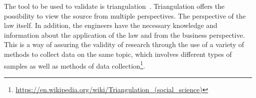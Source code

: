 The tool to be used to validate is triangulation~\citep{carter_use_2014, farquhar_triangulation_2020, runeson_guidelines_2008}.
Triangulation offers the possibility to view the source from multiple perspectives.
The perspective of the law itself.
In addition, the engineers have the necessary knowledge and information about the application of the law and from the business perspective.
This is a way of assuring the validity of research through the use of a variety of methods to collect data on the same topic, which involves different types of samples as well as methods of data collection\footnote{\url{https://en.wikipedia.org/wiki/Triangulation_(social_science)}}.

